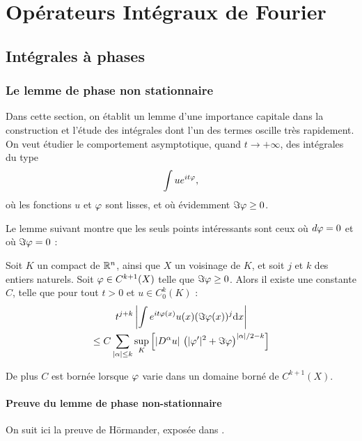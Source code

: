 \chapter{Opérateurs Intégraux de Fourier}

\section{Intégrales à phases}

\subsection{Le lemme de phase non stationnaire}
Dans cette section, on établit un lemme d'une importance capitale dans la
construction et l'étude des intégrales dont l'un des termes oscille très
rapidement. On veut étudier le comportement asymptotique, quand $t \to
+\infty$, des intégrales du type
\begin{equation*}
  \int u e^{it\varphi},
\end{equation*}
\noindent où les fonctions $u$ et $\varphi$ sont lisses, et où évidemment $\Im
\varphi \geq 0$.

Le lemme suivant montre que les seuls points intéressants sont ceux où
$d\varphi=0$ et où $\Im \varphi =0$ :
\begin{lem}
\label{lem:phasenonstat}
Soit $K$ un compact de $\mathbb{R}^n$, ainsi que $X$ un voisinage de $K$, et soit $j$ et
$k$ des entiers naturels. Soit $\varphi \in C^{k+1}(X)$
telle que $\Im \varphi \geq 0$. Alors il existe une constante $C$, telle que
pour tout $t>0$ et $u \in C^k_0(K)$ :
\begin{multline*}
  t^{j+k}\left|\int e^{it\varphi(x)}u(x)(\Im \varphi(x))^j \mathrm{d} x\right| \\\leq C
    \sum_{|\alpha| \leq k} \underset{K}{\sup}\left[|D^{\alpha}u|\,\left(|\varphi'|^2 + \Im \varphi\right)^{|\alpha|/2-k}\right]
\end{multline*}

\noindent De plus $C$ est bornée lorsque $\varphi$ varie dans un domaine borné de $C^{k+1}(X)$.
\end{lem}

\subsubsection{Preuve du lemme de phase non-stationnaire}

On suit ici la preuve de Hörmander, exposée dans \cite{hormander2003analysis}.

